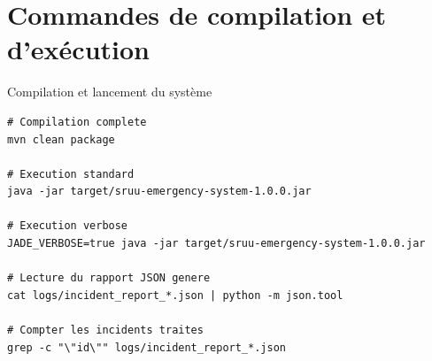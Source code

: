 \documentclass[12pt, a4paper]{report}
\begin{document}
\chapter{Commandes de compilation et d'exécution}

\begin{codebox}{Compilation et lancement du système}
\begin{lstlisting}[style=jsonStyle]
# Compilation complete
mvn clean package

# Execution standard
java -jar target/sruu-emergency-system-1.0.0.jar

# Execution verbose
JADE_VERBOSE=true java -jar target/sruu-emergency-system-1.0.0.jar

# Lecture du rapport JSON genere
cat logs/incident_report_*.json | python -m json.tool

# Compter les incidents traites
grep -c "\"id\"" logs/incident_report_*.json
\end{lstlisting}
\end{codebox}
\end{document}
